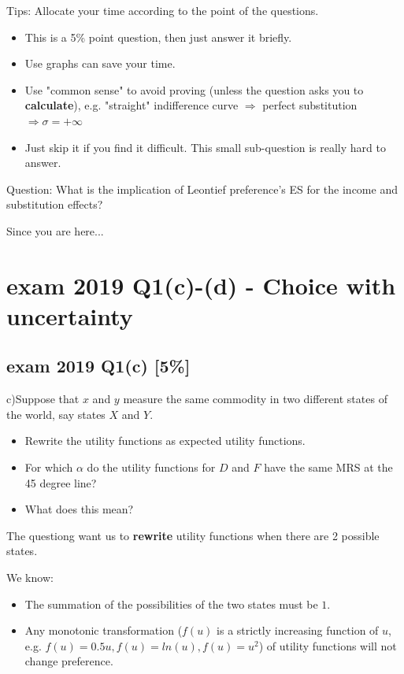 \documentclass{article}
\begin{document}
\begin{mdframed}[backgroundcolor=yellow!20,linecolor=white]
Tips: Allocate your time according to the point of the questions.
\begin{itemize}
\item This is a 5\% point question, then just answer it briefly. 
\item Use graphs can save your time.
\item Use "common sense" to avoid proving (unless the question asks you to \textbf{calculate}), e.g. "straight" indifference curve  $\Rightarrow$ perfect substitution $\Rightarrow \sigma = + \infty $ 
\item Just skip it if you find it difficult. This small sub-question is really hard to answer.
\end{itemize}



\end{mdframed}

\begin{mdframed}[backgroundcolor=blue!20,linecolor=white]
Question: What is the implication of Leontief preference's ES for the income and substitution effects? 
\end{mdframed}

\newpage

Since you are here...
\section{exam 2019 Q1(c)-(d) - Choice with uncertainty}

\subsection{exam 2019 Q1(c) [5\%] }

c)Suppose that $x$ and $y$ measure the same commodity in two
different states of the world, say states $X$ and $Y$. 

\begin{itemize}
\item Rewrite the utility functions as expected utility functions. 
\item For which $\alpha$ do the utility functions for $D$ and $F$ have the same MRS at the 45 degree line?
\item What does this mean?
\end{itemize}

\begin{mdframed}[backgroundcolor=blue!20,linecolor=white]

The questiong want us to \textbf{rewrite} utility functions when there are 2 possible states. 

We know:
\begin{itemize}
\item The summation of the possibilities of the two states must be $1$.
\item Any monotonic transformation ($f(u)$ is a strictly increasing function of $u$, e.g. $f(u) = 0.5 u, f(u) = ln(u), f(u)=u^2 $) of utility functions will not change preference.
\end{itemize}
\end{mdframed}
\end{document}
